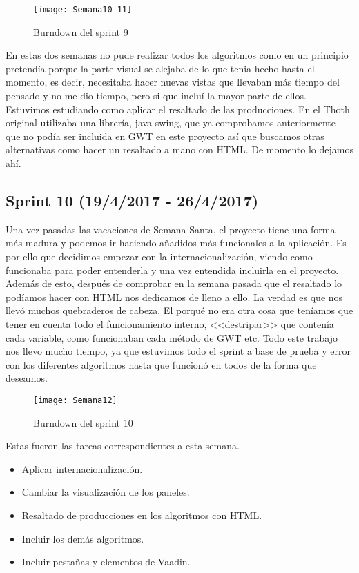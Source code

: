 \begin{figure}[h]
\centering
\texttt{[image: Semana10-11]}
\caption{Burndown del sprint 9}
\label{fig:A.8}
\end{figure}

En estas dos semanas no pude realizar todos los algoritmos como en un principio pretendía porque la parte visual se alejaba de lo que tenia hecho hasta el momento, es decir, necesitaba hacer nuevas vistas que llevaban más tiempo del pensado y no me dio tiempo, pero si que incluí la mayor parte de ellos. Estuvimos estudiando como aplicar el resaltado de las producciones. En el Thoth original utilizaba una librería, java swing, que ya comprobamos anteriormente que no podía ser incluida en GWT en este proyecto así que buscamos otras alternativas como hacer un resaltado a mano con HTML. De momento lo dejamos ahí.

\subsection{Sprint 10 (19/4/2017 - 26/4/2017)}

Una vez pasadas las vacaciones de Semana Santa, el proyecto tiene una forma más madura y podemos ir haciendo añadidos más funcionales a la aplicación. Es por ello que decidimos empezar con la internacionalización, viendo como funcionaba para poder entenderla y una vez entendida incluirla en el proyecto. Además de esto, después de comprobar en la semana pasada que el resaltado lo podíamos hacer con HTML nos dedicamos de lleno a ello. La verdad es que nos llevó muchos quebraderos de cabeza. El porqué no era otra cosa que teníamos que tener en cuenta todo el funcionamiento interno, <<destripar>> que contenía cada variable, como funcionaban cada método de GWT etc. Todo este trabajo nos llevo mucho tiempo, ya que estuvimos todo el sprint a base de prueba y error con los diferentes algoritmos hasta que funcionó en todos de la forma que deseamos.

\begin{figure}[h]
\centering
\texttt{[image: Semana12]}
\caption{Burndown del sprint 10}
\label{fig:A.9}
\end{figure}

Estas fueron las tareas correspondientes a esta semana.

\begin{itemize}
\item Aplicar internacionalización.
\item Cambiar la visualización de los paneles.
\item Resaltado de producciones en los algoritmos con HTML.
\item Incluir los demás algoritmos.
\item Incluir pestañas y elementos de Vaadin.
\end{itemize}

